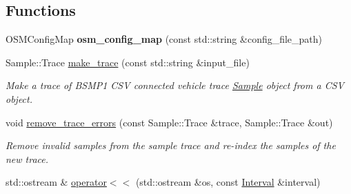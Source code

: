 \subsection*{Functions}
\begin{DoxyCompactItemize}
\item 
O\+S\+M\+Config\+Map {\bfseries osm\+\_\+config\+\_\+map} (const std\+::string \&config\+\_\+file\+\_\+path)\hypertarget{namespacegeo__data_a830f9736d78ea850fa72326194ce5c73}{}\label{namespacegeo__data_a830f9736d78ea850fa72326194ce5c73}

\item 
Sample\+::\+Trace \hyperlink{namespacegeo__data_a9abdfa53deaf2910a1a9dd9c2a8fe024}{make\+\_\+trace} (const std\+::string \&input\+\_\+file)
\begin{DoxyCompactList}\small\item\em Make a trace of B\+S\+M\+P1 C\+SV connected vehicle trace \hyperlink{classgeo__data_1_1Sample}{Sample} object from a C\+SV object. \end{DoxyCompactList}\item 
void \hyperlink{namespacegeo__data_a0570a86d6626b4a1d8ca9880c3dc1e60}{remove\+\_\+trace\+\_\+errors} (const Sample\+::\+Trace \&trace, Sample\+::\+Trace \&out)
\begin{DoxyCompactList}\small\item\em Remove invalid samples from the sample trace and re-\/index the samples of the new trace. \end{DoxyCompactList}\item 
std\+::ostream \& \hyperlink{namespacegeo__data_a27c82a06c2a2db414d46ec592154a94d}{operator$<$$<$} (std\+::ostream \&os, const \hyperlink{classgeo__data_1_1Interval}{Interval} \&interval)
\end{DoxyCompactItemize}
